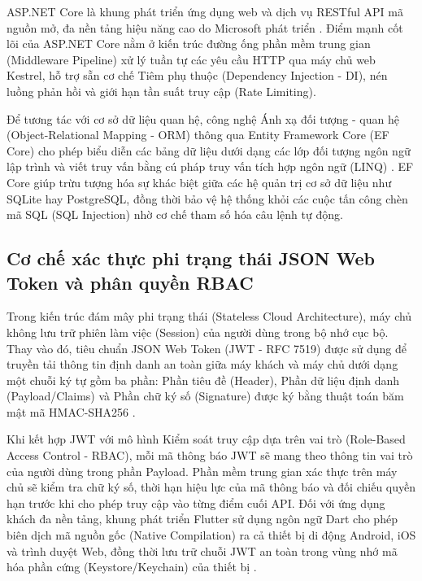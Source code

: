 ASP.NET Core là khung phát triển ứng dụng web và dịch vụ RESTful API mã nguồn mở, đa nền tảng hiệu năng cao do Microsoft phát triển \cite{microsoft2024aspnet}. Điểm mạnh cốt lõi của ASP.NET Core nằm ở kiến trúc đường ống phần mềm trung gian (Middleware Pipeline) xử lý tuần tự các yêu cầu HTTP qua máy chủ web Kestrel, hỗ trợ sẵn cơ chế Tiêm phụ thuộc (Dependency Injection - DI), nén luồng phản hồi và giới hạn tần suất truy cập (Rate Limiting).

Để tương tác với cơ sở dữ liệu quan hệ, công nghệ Ánh xạ đối tượng - quan hệ (Object-Relational Mapping - ORM) thông qua Entity Framework Core (EF Core) cho phép biểu diễn các bảng dữ liệu dưới dạng các lớp đối tượng ngôn ngữ lập trình và viết truy vấn bằng cú pháp truy vấn tích hợp ngôn ngữ (LINQ) \cite{microsoft2024aspnet}. EF Core giúp trừu tượng hóa sự khác biệt giữa các hệ quản trị cơ sở dữ liệu như SQLite hay PostgreSQL, đồng thời bảo vệ hệ thống khỏi các cuộc tấn công chèn mã SQL (SQL Injection) nhờ cơ chế tham số hóa câu lệnh tự động.

\subsection{Cơ chế xác thực phi trạng thái JSON Web Token và phân quyền RBAC}

Trong kiến trúc đám mây phi trạng thái (Stateless Cloud Architecture), máy chủ không lưu trữ phiên làm việc (Session) của người dùng trong bộ nhớ cục bộ. Thay vào đó, tiêu chuẩn JSON Web Token (JWT - RFC 7519) được sử dụng để truyền tải thông tin định danh an toàn giữa máy khách và máy chủ dưới dạng một chuỗi ký tự gồm ba phần: Phần tiêu đề (Header), Phần dữ liệu định danh (Payload/Claims) và Phần chữ ký số (Signature) được ký bằng thuật toán băm mật mã HMAC-SHA256 \cite{jones2015jwt}.

Khi kết hợp JWT với mô hình Kiểm soát truy cập dựa trên vai trò (Role-Based Access Control - RBAC), mỗi mã thông báo JWT sẽ mang theo thông tin vai trò của người dùng trong phần Payload. Phần mềm trung gian xác thực trên máy chủ sẽ kiểm tra chữ ký số, thời hạn hiệu lực của mã thông báo và đối chiếu quyền hạn trước khi cho phép truy cập vào từng điểm cuối API. Đối với ứng dụng khách đa nền tảng, khung phát triển Flutter sử dụng ngôn ngữ Dart cho phép biên dịch mã nguồn gốc (Native Compilation) ra cả thiết bị di động Android, iOS và trình duyệt Web, đồng thời lưu trữ chuỗi JWT an toàn trong vùng nhớ mã hóa phần cứng (Keystore/Keychain) của thiết bị \cite{google2024flutter}.

